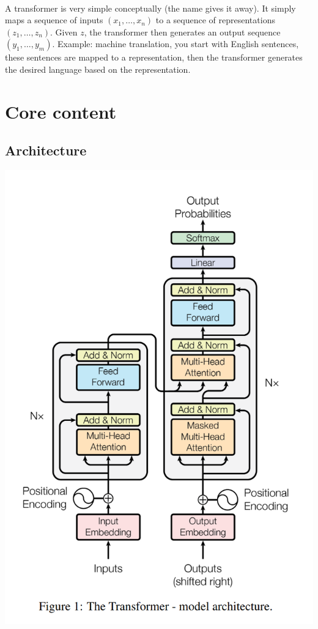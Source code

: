 \documentclass{article}
\begin{document}
    \paragraph{} A transformer is very simple conceptually (the name gives it away). It simply maps a sequence of inputs $(x_1, \dots, x_n)$ to a sequence of representations $(z_1, \dots, z_n)$. Given $z$, the transformer then generates an output sequence $(y_1, \dots, y_m)$.
    Example: machine translation, you start with English sentences, these sentences are mapped to a representation, then the transformer generates the desired language based on the representation.

    \section{Core content}

    \subsection{Architecture}
    \includegraphics[scale=0.3]{fig4.png}
\end{document}
